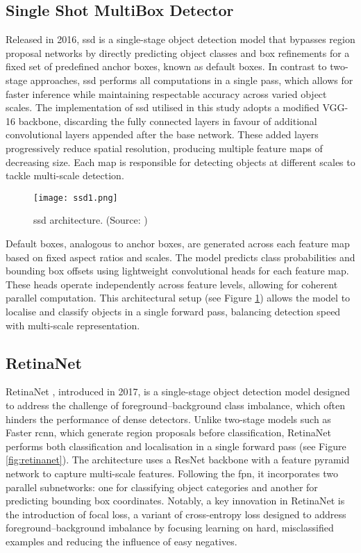 \subsection{Single Shot MultiBox Detector}
\label{subsec:4_ssd}

Released in 2016, \gls{ssd} \cite{ssd} is a single-stage object detection model that bypasses region proposal networks by directly predicting object classes and box refinements for a fixed set of predefined anchor boxes, known as default boxes. In contrast to two-stage approaches, \gls{ssd} performs all computations in a single pass, which allows for faster inference while maintaining respectable accuracy across varied object scales.
The implementation of \gls{ssd} utilised in this study adopts a modified VGG-16 backbone, discarding the fully connected layers in favour of additional convolutional layers appended after the base network. These added layers progressively reduce spatial resolution, producing multiple feature maps of decreasing size. Each map is responsible for detecting objects at different scales to tackle multi-scale detection.

\begin{figure}[!htbp]
    \centering
    \texttt{[image: ssd1.png]}
    \caption{\gls{ssd} architecture. (Source: \cite{ssd})}
    \label{fig:ssd}
\end{figure}

Default boxes, analogous to anchor boxes, are generated across each feature map based on fixed aspect ratios and scales. The model predicts class probabilities and bounding box offsets using lightweight convolutional heads for each feature map. These heads operate independently across feature levels, allowing for coherent parallel computation. This architectural setup (see Figure \ref{fig:ssd}) allows the model to localise and classify objects in a single forward pass, balancing detection speed with multi-scale representation.

\subsection{RetinaNet}
\label{subsec:4_retinanet}

RetinaNet \cite{retinanet}, introduced in 2017, is a single-stage object detection model designed to address the challenge of foreground–background class imbalance, which often hinders the performance of dense detectors. Unlike two-stage models such as Faster \gls{rcnn}, which generate region proposals before classification, RetinaNet performs both classification and localisation in a single forward pass (see Figure \ref{fig:retinanet}).
The architecture uses a ResNet backbone with a feature pyramid network to capture multi-scale features. Following the \gls{fpn}, it incorporates two parallel subnetworks: one for classifying object categories and another for predicting bounding box coordinates. Notably, a key innovation in RetinaNet is the introduction of focal loss, a variant of cross-entropy loss designed to address foreground–background imbalance by focusing learning on hard, misclassified examples and reducing the influence of easy negatives.

